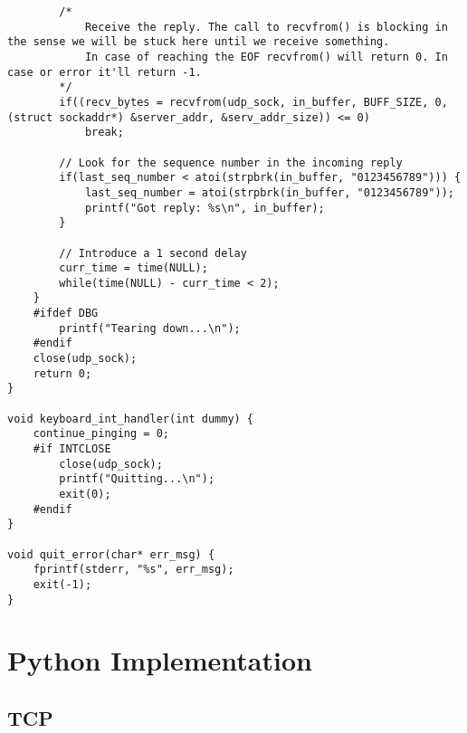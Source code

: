 \documentclass[landscape]{article}
\begin{document}
\begin{verbatim}
        /*
            Receive the reply. The call to recvfrom() is blocking in the sense we will be stuck here until we receive something.
            In case of reaching the EOF recvfrom() will return 0. In case or error it'll return -1.
        */
        if((recv_bytes = recvfrom(udp_sock, in_buffer, BUFF_SIZE, 0, (struct sockaddr*) &server_addr, &serv_addr_size)) <= 0)
            break;

        // Look for the sequence number in the incoming reply
        if(last_seq_number < atoi(strpbrk(in_buffer, "0123456789"))) {
            last_seq_number = atoi(strpbrk(in_buffer, "0123456789"));
            printf("Got reply: %s\n", in_buffer);
        }

        // Introduce a 1 second delay
        curr_time = time(NULL);
        while(time(NULL) - curr_time < 2);
    }
    #ifdef DBG
        printf("Tearing down...\n");
    #endif
    close(udp_sock);
    return 0;
}

void keyboard_int_handler(int dummy) {
    continue_pinging = 0;
    #if INTCLOSE
        close(udp_sock);
        printf("Quitting...\n");
        exit(0);
    #endif
}

void quit_error(char* err_msg) {
    fprintf(stderr, "%s", err_msg);
    exit(-1);
}
                \end{verbatim}

    \section{Python Implementation}
        \subsection{TCP}
\end{document}

